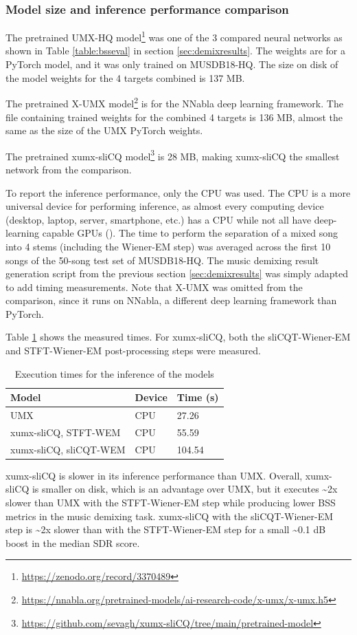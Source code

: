 \documentclass[report.tex]{subfiles}
\begin{document}
\newpagefill

\subsubsection{Model size and inference performance comparison}
\label{sec:inferenceperf}

The pretrained UMX-HQ model\footnote{\url{https://zenodo.org/record/3370489}} was one of the 3 compared neural networks as shown in Table \ref{table:bsseval} in section \ref{sec:demixresults}. The weights are for a PyTorch model, and it was only trained on MUSDB18-HQ. The size on disk of the model weights for the 4 targets combined is 137 MB.

The pretrained X-UMX model\footnote{\url{https://nnabla.org/pretrained-models/ai-research-code/x-umx/x-umx.h5}} is for the NNabla deep learning framework. The file containing trained weights for the combined 4 targets is 136 MB, almost the same as the size of the UMX PyTorch weights.

The pretrained xumx-sliCQ model\footnote{\url{https://github.com/sevagh/xumx-sliCQ/tree/main/pretrained-model}} is 28 MB, making xumx-sliCQ the smallest network from the comparison.

To report the inference performance, only the CPU was used. The CPU is a more universal device for performing inference, as almost every computing device (desktop, laptop, server, smartphone, etc.) has a CPU while not all have deep-learning capable GPUs (\cite{deepcpuinf, deepcpuinf2}). The time to perform the separation of a mixed song into 4 stems (including the Wiener-EM step) was averaged across the first 10 songs of the 50-song test set of MUSDB18-HQ. The music demixing result generation script from the previous section \ref{sec:demixresults} was simply adapted to add timing measurements. Note that X-UMX was omitted from the comparison, since it runs on NNabla, a different deep learning framework than PyTorch.

Table \ref{table:infperf} shows the measured times. For xumx-sliCQ, both the sliCQT-Wiener-EM and STFT-Wiener-EM post-processing steps were measured.

\begin{table}[ht]
	\centering
	\caption{Execution times for the inference of the models}
	\label{table:infperf}
	\begin{tabular}{ |l|l|l| }
	 \hline
		Model & Device & Time (s) \\
	 \hline
	 \hline
		UMX & CPU & 27.26  \\
	 \hline
		xumx-sliCQ, STFT-WEM & CPU & 55.59  \\
	 \hline
		xumx-sliCQ, sliCQT-WEM & CPU & 104.54  \\
	 \hline
\end{tabular}
\end{table}

xumx-sliCQ is slower in its inference performance than UMX. Overall, xumx-sliCQ is smaller on disk, which is an advantage over UMX, but it executes \textasciitilde2x slower than UMX with the STFT-Wiener-EM step while producing lower BSS metrics in the music demixing task. xumx-sliCQ with the sliCQT-Wiener-EM step is \textasciitilde2x slower than with the STFT-Wiener-EM step for a small \textasciitilde0.1 dB boost in the median SDR score.
\end{document}
